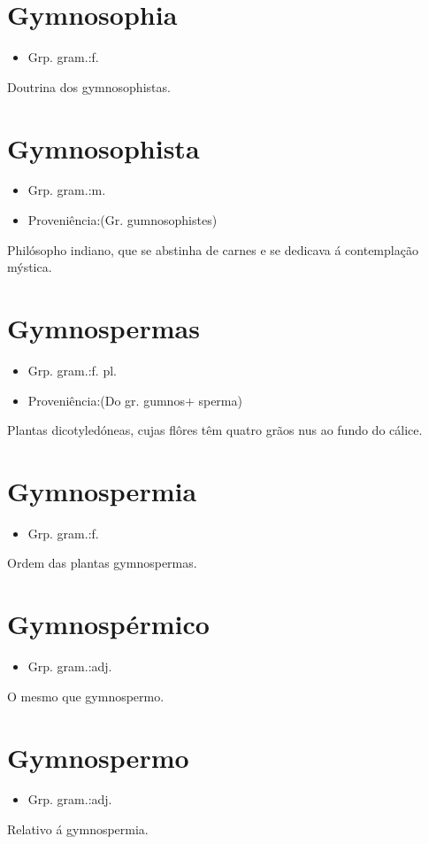 \section{Gymnosophia}
\begin{itemize}
\item {Grp. gram.:f.}
\end{itemize}
Doutrina dos gymnosophistas.
\section{Gymnosophista}
\begin{itemize}
\item {Grp. gram.:m.}
\end{itemize}
\begin{itemize}
\item {Proveniência:(Gr. \textunderscore gumnosophistes\textunderscore )}
\end{itemize}
Philósopho indiano, que se abstinha de carnes e se dedicava á contemplação mýstica.
\section{Gymnospermas}
\begin{itemize}
\item {Grp. gram.:f. pl.}
\end{itemize}
\begin{itemize}
\item {Proveniência:(Do gr. \textunderscore gumnos\textunderscore  + \textunderscore sperma\textunderscore )}
\end{itemize}
Plantas dicotyledóneas, cujas flôres têm quatro grãos nus ao fundo do cálice.
\section{Gymnospermia}
\begin{itemize}
\item {Grp. gram.:f.}
\end{itemize}
Ordem das plantas gymnospermas.
\section{Gymnospérmico}
\begin{itemize}
\item {Grp. gram.:adj.}
\end{itemize}
O mesmo que \textunderscore gymnospermo\textunderscore .
\section{Gymnospermo}
\begin{itemize}
\item {Grp. gram.:adj.}
\end{itemize}
Relativo á gymnospermia.
